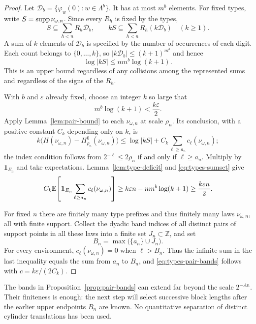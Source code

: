 \begin{proof}
Let $\mathcal D_b=\{\varphi_w(0):w\in\Lambda^b\}$.
It has at most $m^b$ elements.  For fixed types, write
$S=\operatorname{supp}\nu_{\omega,n}$.
Since every $R_h$ is fixed by the types,
\[
 S\subseteq\sum_{h<n}R_h\mathcal D_b,
 \qquad kS\subseteq\sum_{h<n}R_h(k\mathcal D_b)
 \quad(k\ge1).
\]
A sum of $k$ elements of $\mathcal D_b$ is specified by the number
of occurrences of each digit.  Each count belongs to $\{0,\ldots,k\}$,
so $|k\mathcal D_b|\le(k+1)^{m^b}$ and hence
\begin{equation}\label{eq:types-sumset}
 \log|kS|\le nm^b\log(k+1).
\end{equation}
This is an upper bound regardless of any collisions among the represented
sums and regardless of the signs of the $R_h$.

With $b$ and $\varepsilon$ already fixed, choose an integer $k$ so large
that
\[
 m^b\log(k+1)<\frac{k\varepsilon}{2}.
\]
Apply Lemma~\ref{lem:pair-bound} to each $\nu_{\omega,n}$ at scale
$\rho_n$.  Its conclusion, with a positive constant $C_k$ depending
only on $k$, is
\[
 k\bigl(H(\nu_{\omega,n})-H_{\rho_n}^0(\nu_{\omega,n})\bigr)
 \le\log|kS|+C_k\sum_{\ell\ge a_n}c_\ell(\nu_{\omega,n});
\]
the index condition follows from
$2^{-\ell}\le2\rho_n$ if and only if $\ell\ge a_n$.
Multiply by $\mathbf1_{E_n}$ and take expectations.
Lemma~\ref{lem:type-deficit} and \eqref{eq:types-sumset} give
\[
 C_k\mathbb E\!\left[\mathbf1_{E_n}
       \sum_{\ell\ge a_n}c_\ell(\nu_{\omega,n})\right]
 \ge k\varepsilon n-nm^b\log(k+1)
 \ge\frac{k\varepsilon n}{2}.
\]

For fixed $n$ there are finitely many type prefixes and thus finitely
many laws $\nu_{\omega,n}$, all with finite support.
Collect the dyadic band indices of all distinct pairs of support points
in all these laws into a finite set $J_n\subset\mathbb Z$, and set
\[
 B_n=\max\bigl(\{a_n\}\cup J_n\bigr).
\]
For every environment, $c_\ell(\nu_{\omega,n})=0$ when $\ell>B_n$.
Thus the infinite sum in the last inequality equals the sum from $a_n$
to $B_n$, and \eqref{eq:types-pair-bands} follows with
$c=k\varepsilon/(2C_k)$.
\end{proof}

The bands in Proposition~\ref{prop:pair-bands} can extend far beyond the
scale $2^{-An}$.  Their finiteness is enough: the next step will select
successive block lengths after the earlier upper endpoints $B_n$ are
known.  No quantitative separation of distinct cylinder translations
has been used.
